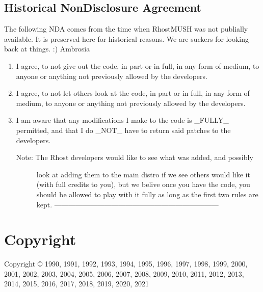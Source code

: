 \documentclass[letterpaper,10pt,english]{sphinxmanual}
\begin{document}
\section{Historical Non\sphinxhyphen{}Disclosure Agreement}
\label{\detokenize{nda:historical-non-disclosure-agreement}}\label{\detokenize{nda::doc}}
\sphinxAtStartPar
The following NDA comes from the time when RhostMUSH was not publially
available. It is preserved here for historical reasons. We are suckers for
looking back at things. :)
\textendash{}Ambrosia
\begin{enumerate}
%
\item {} 
\sphinxAtStartPar
I agree, to not give out the code, in part or in full, in any form of
medium, to anyone or anything not previously allowed by the developers.

\item {} 
\sphinxAtStartPar
I agree, to not let others look at the code, in part or in full, in
any form of medium, to anyone or anything not previously allowed by the
developers.

\item {} 
\sphinxAtStartPar
I am aware that any modifications I make to the code is \_FULLY\_
permitted, and that I do \_NOT\_ have to return said patches to the
developers.
\begin{quote}
\end{quote}
\begin{description}
\item[{Note: The Rhost developers would like to see what was added, and possibly}] \leavevmode
\sphinxAtStartPar
look at adding them to the main distro if we see others would like
it (with full credits to you), but we belive once you have the code,
you should be allowed to play with it fully as long as the first two
rules are kept.
———————————————————————

\end{description}

\end{enumerate}


\chapter{Copyright}
\label{\detokenize{index:copyright}}\label{\detokenize{index:id1}}
\sphinxAtStartPar
Copyright © 1990, 1991, 1992, 1993, 1994, 1995, 1996, 1997, 1998, 1999,
2000, 2001, 2002, 2003, 2004, 2005, 2006, 2007, 2008, 2009, 2010, 2011, 2012,
2013, 2014, 2015, 2016, 2017, 2018, 2019, 2020, 2021
\end{document}
